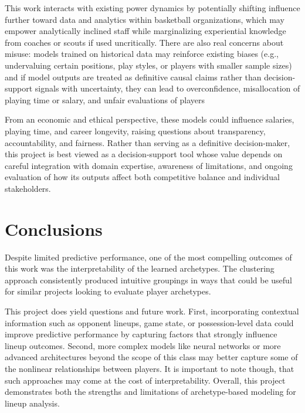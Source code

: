 \documentclass{article}
\begin{document}
This work interacts with existing power dynamics by potentially shifting influence further 
toward data and analytics within basketball organizations, which may empower analytically 
inclined staff while marginalizing experiential knowledge from coaches or scouts if used 
uncritically. There are also real concerns about misuse: models trained on historical data may 
reinforce existing biases (e.g., undervaluing certain positions, play styles, or players with 
smaller sample sizes) and if model outputs are treated as definitive causal claims rather than 
decision-support signals with uncertainty, they can lead to overconfidence, misallocation of 
playing time or salary, and unfair evaluations of players

From an economic and ethical perspective, these models could influence salaries, playing time, 
and career longevity, raising questions about transparency, accountability, and fairness. Rather 
than serving as a definitive decision-maker, this project is best viewed as a decision-support 
tool whose value depends on careful integration with domain expertise, awareness of limitations, 
and ongoing evaluation of how its outputs affect both competitive balance and individual 
stakeholders.



\section{Conclusions}
\label{conclusion}

Despite limited predictive performance, one of the most compelling outcomes of this work was 
the interpretability of the learned archetypes. The clustering approach consistently produced 
intuitive groupings in ways that could be useful for similar projects looking to evaluate player 
archetypes.

This project does yield questions and future work. First, incorporating contextual information 
such as opponent lineups, game state, or possession-level data could improve predictive performance 
by capturing factors that strongly influence lineup outcomes. Second, more complex models 
like neural networks or more advanced architectures beyond the scope of this class may better 
capture some of the nonlinear relationships between players. It is important to note though, 
that such approaches may come at the cost of interpretability. Overall, this project demonstrates 
both the strengths and limitations of archetype-based modeling for lineup analysis.
\end{document}
